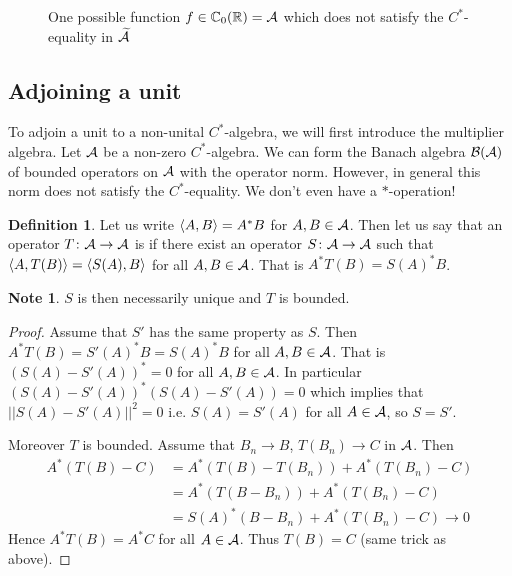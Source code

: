 \documentclass[10pt,english,a4paper]{article}
\theoremstyle{definition}
\newtheorem*{definition}{Definition}
\newtheorem*{note}{Note}
\let\emph\relax %
\def\tAs{\widetilde{\As}}
\begin{document}
\begin{figure}[htbp]
    \centering
    \caption{ One possible function $f \in \mathbb{C}_0(\mathbb{R}) = \mathcal{A}$ which does not satisfy the $C^*$-equality in $\tAs$} 
\end{figure}


\subsection{Adjoining a unit}


To adjoin a unit to a non-unital $C^*$-algebra, we will first introduce the multiplier 
algebra. Let $\mathcal{A}$ be a non-zero $C^*$-algebra. We can form the Banach algebra 
$\mathcal{B}(\mathcal{A})$ of bounded operators on $\mathcal{A}$ with the operator norm. However, in 
general this norm does not satisfy the $C^*$-equality. We don't even have a 
$*$-operation! 

\begin{definition}
    
Let us write $\left\langle A,B \right\rangle = A^*B$ for $A,B \in \mathcal{A}$. Then let us
say that an operator 
$ T \colon \mathcal{A} \to \mathcal{A}$ is \emph{adjointable}
if there exist an operator $S\colon \mathcal{A} \to \mathcal{A}$ such that $\left\langle A,T(B) \right\rangle= \left\langle S(A), B \right\rangle$
for all $A,B \in \mathcal{A}$. That is $A^*T(B) = S(A)^*B$.
\end{definition}


\begin{note}
    $S$ is then necessarily unique and $T$ is bounded.
\end{note}
\begin{proof}
    Assume that $S'$ has the same property as $S$. Then $A^* T(B) = S'(A)^*B = S(A)^*B$
for all $A,B \in \mathcal{A}$. That is $(S(A)-S'(A))^*= 0$ for all $A,B \in \mathcal{A}$. In particular 
$(S(A) -S'(A))^*(S(A)-S'(A)) =0$ which implies that $||S(A)-S'(A)||^2 = 0$ i.e.
$S(A)=S'(A)$ for all $A \in \mathcal{A}$, so $S = S'$.

Moreover $T$ is bounded. 
Assume that $B_n \to B$, $T(B_n) \to C$ in $\mathcal{A}$. Then 
\begin{align*}
A^*(T(B)-C) &=
A^* (T(B)-T(B_n)) + A^*(T(B_n)-C) \\
&= A^*(T(B-B_n)) + A^*(T(B_n)-C) \\ &= S(A)^*(B-B_n) + A^*(T(B_n)-C) \to 0
\end{align*}
Hence $A^*T(B) = A^*C $ for all $A \in \mathcal{A}$. Thus $T(B) = C$ (same trick as above).
\end{proof}
\end{document}
